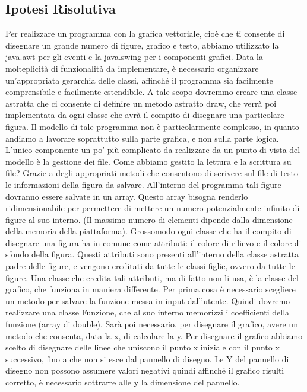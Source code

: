 \documentclass[a4paper,12pt,times,numbered,print,index]{article}
\begin{document}
\subsection{Ipotesi Risolutiva}
Per realizzare un programma con la grafica vettoriale, cioè che ti consente di disegnare un grande numero di figure, grafico e testo, abbiamo utilizzato la java.awt per gli eventi e la java.swing per i componenti grafici.
Data la molteplicità di funzionalità da implementare, è necessario organizzare un’appropriata gerarchia delle classi, affinché il programma sia facilmente comprensibile e facilmente estendibile.
A tale scopo dovremmo creare una classe astratta che ci consente di definire un metodo astratto draw, che verrà poi implementata da ogni classe che avrà il compito di disegnare una particolare figura.
Il modello di tale programma non è particolarmente complesso, in quanto andiamo a lavorare soprattutto sulla parte grafica, e non sulla parte logica.
L’unico componente un po’ più complicato da realizzare da un punto di vista del modello è la gestione dei file.
Come abbiamo gestito la lettura e la scrittura su file?
Grazie a degli appropriati metodi che consentono di scrivere sul file di testo le informazioni della figura da salvare.
All’interno del programma tali figure dovranno essere salvate in un array.
Questo array bisogna renderlo ridimensionabile per permettere di mettere un numero potenzialmente infinito di figure al suo interno. (Il massimo numero di elementi dipende dalla dimensione della memoria della piattaforma).
Grossomodo ogni classe che ha il compito di disegnare una figura ha in comune come attributi: il colore di rilievo e il colore di sfondo della figura.
Questi attributi sono presenti all’interno della classe astratta padre delle figure, e vengono ereditati da tutte le classi figlie, ovvero da tutte le figure.
Una classe che eredita tali attributi, ma di fatto non li usa, è la classe del grafico, che funziona in maniera differente.
Per prima cosa è necessario scegliere un metodo per salvare la funzione messa in input dall’utente.
Quindi dovremo realizzare una classe Funzione, che al suo interno memorizzi i coefficienti della funzione (array di double).
Sarà poi necessario, per disegnare il grafico, avere un metodo che consenta, data la x, di calcolare la y.
Per disegnare il grafico abbiamo scelto di disegnare delle linee che uniscono il punto x iniziale con il punto x successivo, fino a che non si esce dal pannello di disegno.
Le Y del pannello di disegno non possono assumere valori negativi quindi affinché il grafico risulti corretto, è necessario sottrarre alle y  la dimensione del pannello.
\end{document}

